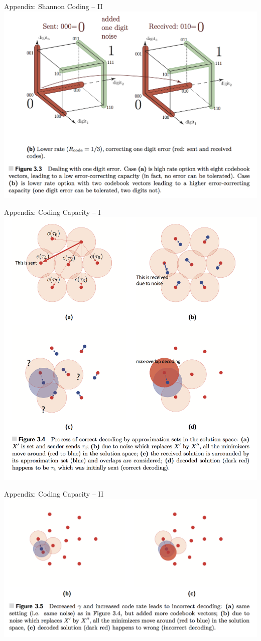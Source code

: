 \documentclass[presentation,12pt]{beamer}
\begin{document}
\begin{frame}{Appendix: Shannon Coding -- II}
  \centering
  \includegraphics[width=\textwidth]{shannon_coding_2.png}
\end{frame}

\begin{frame}{Appendix: Coding Capacity -- I}
  \centering
  \includegraphics[width=.7\textwidth]{asc_decoding_scheme.png}
\end{frame}

\begin{frame}{Appendix: Coding Capacity -- II}
  \centering
  \includegraphics[width=.7\textwidth]{asc_decoding_scheme_2.png}
\end{frame}
\end{document}

